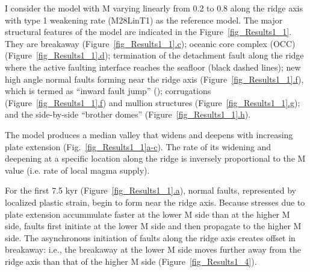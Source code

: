 I consider the model with M varying linearly from 0.2 to 0.8 along the ridge axis with type 1 weakening rate (M28LinT1) as the reference model. The major structural features of the model are indicated in the Figure~\hyperref[fig_Results1_1]{\ref{fig_Results1_1}}. They are breakaway (Figure~\hyperref[fig_Results1_1]{\ref{fig_Results1_1}.c}); oceanic core complex (OCC) (Figure~\hyperref[fig_Results1_1]{\ref{fig_Results1_1}.d}); termination of the detachment fault along the ridge where the active faulting interface reaches the seafloor (black dashed lines); new high angle normal faults forming near the ridge axis (Figure~\hyperref[fig_Results1_1]{\ref{fig_Results1_1}.f}), which is termed as ``inward fault jump'' (\citealp{Tucholke1998}); corrugations (Figure~\hyperref[fig_Results1_1]{\ref{fig_Results1_1}.f}) and mullion structures (Figure~\hyperref[fig_Results1_1]{\ref{fig_Results1_1}.g}); and the side-by-side ``brother domes'' (Figure~\hyperref[fig_Results1_1]{\ref{fig_Results1_1}.h}).    

The model produces a median valley that widens and deepens with increasing plate extension (Fig.~\hyperref[fig_Results1_1]{\ref{fig_Results1_1}a-c}). The rate of its widening and deepening at a specific location along the ridge is inversely proportional to the M value (i.e. rate of local magma supply). %

For the first 7.5 kyr (Figure~\hyperref[fig_Results1_1]{\ref{fig_Results1_1}.a}), %
normal faults, represented by localized plastic strain, begin to form near the ridge axis.
Because stresses due to plate extension accummulate faster at the lower M side than at the higher M side, faults first initiate at the lower M side and then propagate to the higher M side. The asynchronous initiation of faults along the ridge axis creates offset in breakaway: i.e., the breakaway at the lower M side moves further away from the ridge axis than that of the higher M side (Figure~\hyperref[fig_Results1_4]{\ref{fig_Results1_4}}).

